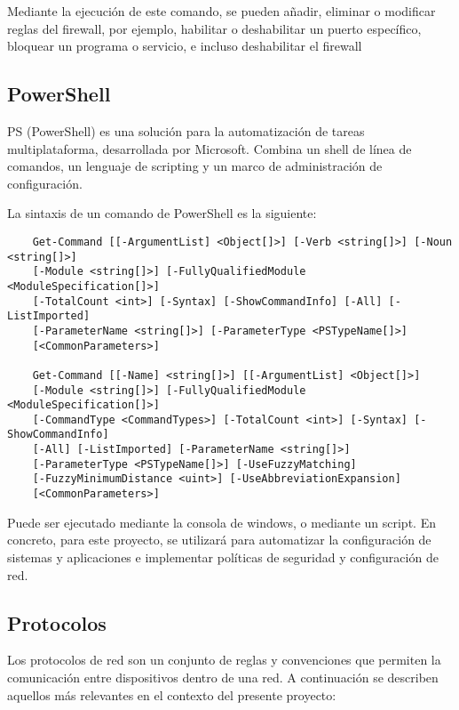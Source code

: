 Mediante la ejecución de este comando, se pueden añadir, eliminar o modificar reglas del firewall, por ejemplo,
habilitar o deshabilitar un puerto específico, bloquear un programa o servicio, e incluso deshabilitar el firewall
\cite{microsoftFirewallCLI}

\subsection{PowerShell}\label{subsec:powershell}

PS (PowerShell)\cite{microsoftPowerShellOverview} es una solución para la automatización de tareas multiplataforma,
desarrollada por Microsoft.
Combina un shell de línea de comandos, un lenguaje de scripting y un marco de administración de configuración.

La sintaxis de un comando de PowerShell es la siguiente:

\begin{verbatim}
	Get-Command [[-ArgumentList] <Object[]>] [-Verb <string[]>] [-Noun <string[]>]
	[-Module <string[]>] [-FullyQualifiedModule <ModuleSpecification[]>]
	[-TotalCount <int>] [-Syntax] [-ShowCommandInfo] [-All] [-ListImported]
	[-ParameterName <string[]>] [-ParameterType <PSTypeName[]>]
	[<CommonParameters>]

	Get-Command [[-Name] <string[]>] [[-ArgumentList] <Object[]>]
	[-Module <string[]>] [-FullyQualifiedModule <ModuleSpecification[]>]
	[-CommandType <CommandTypes>] [-TotalCount <int>] [-Syntax] [-ShowCommandInfo]
	[-All] [-ListImported] [-ParameterName <string[]>]
	[-ParameterType <PSTypeName[]>] [-UseFuzzyMatching]
	[-FuzzyMinimumDistance <uint>] [-UseAbbreviationExpansion]
	[<CommonParameters>]
\end{verbatim}

Puede ser ejecutado mediante la consola de windows, o mediante un script.
En concreto, para este proyecto, se utilizará para automatizar la configuración de sistemas y aplicaciones e
implementar políticas de seguridad y configuración de red.

\subsection{Protocolos}\label{subsec:protocolos}

Los protocolos de red son un conjunto de reglas y convenciones que permiten la comunicación entre dispositivos dentro
de una red.
A continuación se describen aquellos más relevantes en el contexto del presente proyecto:

